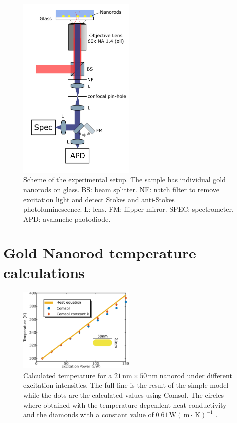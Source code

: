 \documentclass[journal=nalefd,manuscript=letter]{achemso}
\newcommand{\K}{\ensuremath{\,\textrm{K}}}
\newcommand{\nm}{\ensuremath{\,\textrm{nm}}}
\newcommand{\m}{\ensuremath{\,\textrm{m}}}
\newcommand{\W}{\ensuremath{\,\textrm{W}}}
\begin{document}
\begin{figure}[htp] \centering
\includegraphics[width=0.5\textwidth]{Figures/Supplementary/02_Setup/setup.png}
\caption{Scheme of the experimental setup. The sample has individual gold nanorods on glass. BS: beam splitter. NF: notch filter to remove excitation light and detect Stokes and anti-Stokes photoluminescence. L: lens. FM: flipper mirror. SPEC: spectrometer. APD: avalanche photodiode.}
	\label{fig:setup}
\end{figure}


\section{Gold Nanorod temperature calculations} \label{sec:temp-calc}

\begin{figure}[htp] \centering
\includegraphics[width=0.5\textwidth]{Figures/Supplementary/04_Compare_Comsol/04_Compare_Comsol.png}
\caption{Calculated temperature for a $21\nm\times 50\nm$ nanorod under
different excitation intensities. The full line is the result of the simple
model while the dots are the calculated values using Comsol. The circles where obtained
with the temperature-dependent heat conductivity and the diamonds with a constant value of $0.61 \W(\m\cdot\K)^{-1}$ .}
	\label{fig:Compare-Comsol}
\end{figure}
\end{document}
